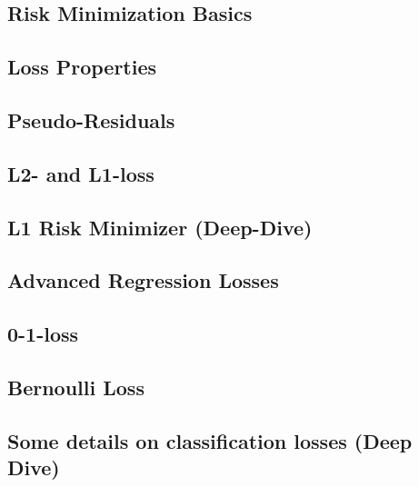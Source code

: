 \subsection{Risk Minimization Basics}


\subsection{Loss Properties}


\subsection{Pseudo-Residuals}


\subsection{L2- and L1-loss}


\subsection{L1 Risk Minimizer (Deep-Dive)}


\subsection{Advanced Regression Losses}


\subsection{0-1-loss}


\subsection{Bernoulli Loss}


\subsection{Some details on classification losses (Deep Dive)}


